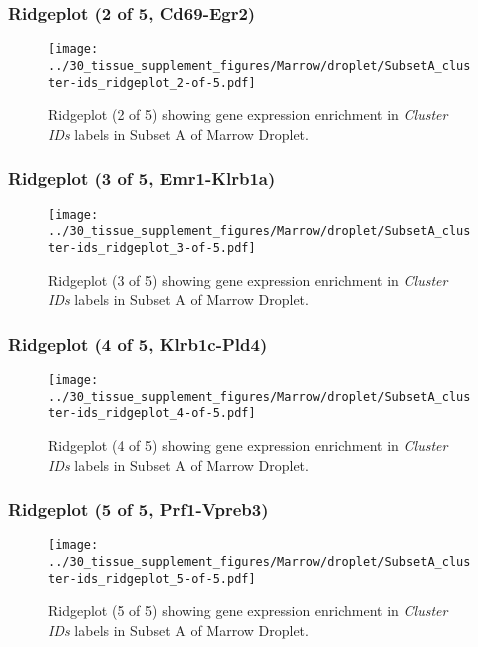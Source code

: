 \subsubsection{Ridgeplot (2 of 5, Cd69-Egr2)}
\begin{figure}[h]
\centering
\texttt{[image: ../30\_tissue\_supplement\_figures/Marrow/droplet/SubsetA\_cluster-ids\_ridgeplot\_2-of-5.pdf]}

\caption{ Ridgeplot (2 of 5)  showing gene expression enrichment in \emph{Cluster IDs} labels in Subset A of Marrow Droplet. }
\end{figure}


\clearpage

\subsubsection{Ridgeplot (3 of 5, Emr1-Klrb1a)}
\begin{figure}[h]
\centering
\texttt{[image: ../30\_tissue\_supplement\_figures/Marrow/droplet/SubsetA\_cluster-ids\_ridgeplot\_3-of-5.pdf]}

\caption{ Ridgeplot (3 of 5)  showing gene expression enrichment in \emph{Cluster IDs} labels in Subset A of Marrow Droplet. }
\end{figure}


\clearpage

\subsubsection{Ridgeplot (4 of 5, Klrb1c-Pld4)}
\begin{figure}[h]
\centering
\texttt{[image: ../30\_tissue\_supplement\_figures/Marrow/droplet/SubsetA\_cluster-ids\_ridgeplot\_4-of-5.pdf]}

\caption{ Ridgeplot (4 of 5)  showing gene expression enrichment in \emph{Cluster IDs} labels in Subset A of Marrow Droplet. }
\end{figure}


\clearpage

\subsubsection{Ridgeplot (5 of 5, Prf1-Vpreb3)}
\begin{figure}[h]
\centering
\texttt{[image: ../30\_tissue\_supplement\_figures/Marrow/droplet/SubsetA\_cluster-ids\_ridgeplot\_5-of-5.pdf]}

\caption{ Ridgeplot (5 of 5)  showing gene expression enrichment in \emph{Cluster IDs} labels in Subset A of Marrow Droplet. }
\end{figure}


